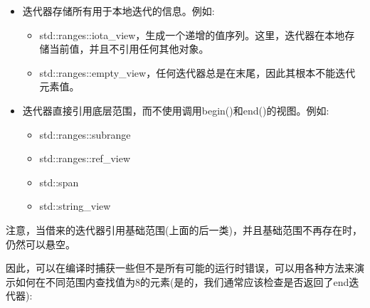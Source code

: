 \begin{itemize}
\item
迭代器存储所有用于本地迭代的信息。例如:

\begin{itemize}
\item
std::ranges::iota\_view，生成一个递增的值序列。这里，迭代器在本地存储当前值，并且不引用任何其他对象。

\item
std::ranges::empty\_view，任何迭代器总是在末尾，因此其根本不能迭代元素值。
\end{itemize}

\item
迭代器直接引用底层范围，而不使用调用begin()和end()的视图。例如:

\begin{itemize}
\item
std::ranges::subrange

\item
std::ranges::ref\_view

\item
std::span

\item
std::string\_view
\end{itemize}
\end{itemize}

注意，当借来的迭代器引用基础范围(上面的后一类)，并且基础范围不再存在时，仍然可以悬空。

因此，可以在编译时捕获一些但不是所有可能的运行时错误，可以用各种方法来演示如何在不同范围内查找值为8的元素(是的，我们通常应该检查是否返回了end迭代器):

